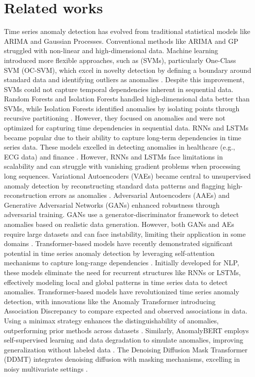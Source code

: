 \section{Related works}
Time series anomaly detection has evolved from traditional statistical models like ARIMA and Gaussian Processes\cite{box2015time,rasmussen2006gaussian}. Conventional methods like ARIMA and GP struggled with non-linear and high-dimensional data. Machine learning introduced more flexible approaches, such as  (SVMs), particularly One-Class SVM (OC-SVM), which excel in novelty detection by defining a boundary around standard data and identifying outliers as anomalies \cite{scholkopf2000support}. Despite this improvement, SVMs could not capture temporal dependencies inherent in sequential data.
Random Forests and  Isolation Forests handled high-dimensional data better than SVMs, while Isolation Forests identified anomalies by isolating points through recursive partitioning \cite{liu2008isolation}. However, they focused on anomalies and were not optimized for capturing time dependencies in sequential data. RNNs and  LSTMs became popular due to their ability to capture long-term dependencies in time series data. These models excelled in detecting anomalies in healthcare (e.g., ECG data) and finance \cite{distante2022hf}. However, RNNs and LSTMs face limitations in scalability and can struggle with vanishing gradient problems when processing long sequences.
Variational Autoencoders (VAEs) became central to unsupervised anomaly detection by reconstructing standard data patterns and flagging high-reconstruction errors as anomalies \cite{kingma2013auto}. Adversarial Autoencoders (AAEs) and Generative Adversarial Networks (GANs) enhanced robustness through adversarial training. GANs use a generator-discriminator framework to detect anomalies based on realistic data generation. However, both GANs and AEs require large datasets and can face instability, limiting their application in some domains \cite{schlegl2019f,li2019mad}.
Transformer-based models have recently demonstrated significant potential in time series anomaly detection by leveraging self-attention mechanisms to capture long-range dependencies \cite{vaswani2017attention}. Initially developed for NLP, these models eliminate the need for recurrent structures like RNNs or LSTMs, effectively modeling local and global patterns in time series data to detect anomalies.
Transformer-based models have revolutionized time series anomaly detection, with innovations like the Anomaly Transformer introducing Association Discrepancy to compare expected and observed associations in data. Using a minimax strategy enhances the distinguishability of anomalies, outperforming prior methods across datasets \cite{xu2022anomaly}. Similarly, AnomalyBERT employs self-supervised learning and data degradation to simulate anomalies, improving generalization without labeled data \cite{jeong2023anomalybert}. The Denoising Diffusion Mask Transformer (DDMT) integrates denoising diffusion with masking mechanisms, excelling in noisy multivariate settings \cite{yang2023ddmt}.
